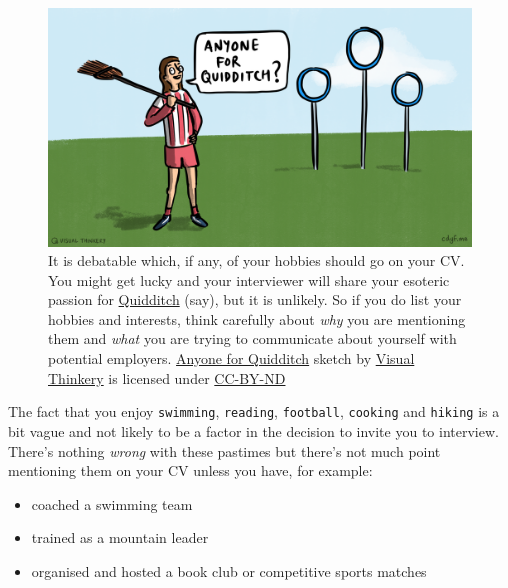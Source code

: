 \documentclass[
]{book}
\providecommand{\tightlist}{%
  \setlength{\itemsep}{0pt}\setlength{\parskip}{0pt}}
\begin{document}
\begin{figure}

{\centering \includegraphics[width=0.98\linewidth]{images/Anyone for quidditch} 

}

\caption{It is debatable which, if any, of your hobbies should go on your CV. You might get lucky and your interviewer will share your esoteric passion for \href{https://en.wikipedia.org/wiki/Quidditch_(real-life_sport)}{Quidditch} (say), but it is unlikely. So if you do list your hobbies and interests, think carefully about \emph{why} you are mentioning them and \emph{what} you are trying to communicate about yourself with potential employers. \href{https://en.wikipedia.org/wiki/Anyone_for_tennis\%3F}{Anyone for Quidditch} sketch by \href{https://visualthinkery.com/}{Visual Thinkery} is licensed under \href{https://creativecommons.org/licenses/by-nd/4.0/}{CC-BY-ND}}\label{fig:quidditch-fig}
\end{figure}



The fact that you enjoy \texttt{swimming}, \texttt{reading}, \texttt{football}, \texttt{cooking} and \texttt{hiking} is a bit vague and not likely to be a factor in the decision to invite you to interview. There's nothing \emph{wrong} with these pastimes but there's not much point mentioning them on your CV unless you have, for example:

\begin{itemize}
\tightlist
\item
  coached a swimming team
\item
  trained as a mountain leader
\item
  organised and hosted a book club or competitive sports matches
\end{itemize}
\end{document}
